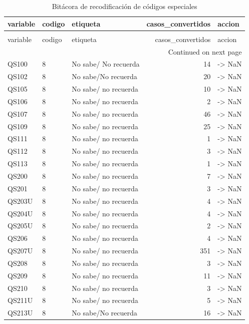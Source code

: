 \begin{longtable}{lllrl}
\caption{Bitácora de recodificación de códigos especiales} \label{tab:tabla_03b_bitacora_limpieza_codigos} \\
\toprule
variable & codigo & etiqueta & casos\_convertidos & accion \\
\midrule
\endfirsthead
\caption[]{Bitácora de recodificación de códigos especiales} \\
\toprule
variable & codigo & etiqueta & casos\_convertidos & accion \\
\midrule
\endhead
\midrule
\multicolumn{5}{r}{Continued on next page} \\
\midrule
\endfoot
\bottomrule
\endlastfoot
QS100 & 8 & No sabe/ No recuerda & 14 & -> NaN \\
QS102 & 8 & No sabe/No recuerda & 20 & -> NaN \\
QS105 & 8 & No sabe/ no recuerda & 10 & -> NaN \\
QS106 & 8 & No sabe/ no recuerda & 2 & -> NaN \\
QS107 & 8 & No sabe/ no recuerda & 46 & -> NaN \\
QS109 & 8 & No sabe/ no recuerda & 25 & -> NaN \\
QS111 & 8 & No sabe/ no recuerda & 1 & -> NaN \\
QS112 & 8 & No sabe/ no recuerda & 3 & -> NaN \\
QS113 & 8 & No sabe/ no recuerda & 1 & -> NaN \\
QS200 & 8 & No sabe/ no recuerda & 7 & -> NaN \\
QS201 & 8 & No sabe/ no recuerda & 3 & -> NaN \\
QS203U & 8 & No sabe/ no recuerda & 4 & -> NaN \\
QS204U & 8 & No sabe/ no recuerda & 4 & -> NaN \\
QS205U & 8 & No sabe/ no recuerda & 2 & -> NaN \\
QS206 & 8 & No sabe/ no recuerda & 4 & -> NaN \\
QS207U & 8 & No sabe/ no recuerda & 351 & -> NaN \\
QS208 & 8 & No sabe/ no recuerda & 3 & -> NaN \\
QS209 & 8 & No sabe/ no recuerda & 11 & -> NaN \\
QS210 & 8 & No sabe/ no recuerda & 3 & -> NaN \\
QS211U & 8 & No sabe/ no recuerda & 5 & -> NaN \\
QS213U & 8 & No sabe/No recuerda & 16 & -> NaN \\

\end{longtable}
